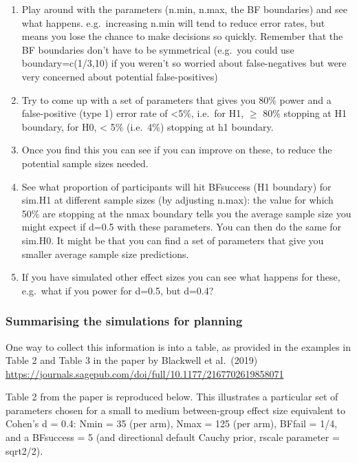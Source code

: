 \documentclass[
]{book}
\begin{document}
\begin{enumerate}
\def\labelenumi{\arabic{enumi}.}
\item
  Play around with the parameters (n.min, n.max, the BF boundaries) and see what happens. e.g.~increasing n.min will tend to reduce error rates, but means you lose the chance to make decisions so quickly. Remember that the BF boundaries don't have to be symmetrical (e.g.~you could use boundary=c(1/3,10) if you weren't so worried about false-negatives but were very concerned about potential false-positives)
\item
  Try to come up with a set of parameters that gives you 80\% power and a false-positive (type 1) error rate of \textless5\%, i.e.~for H1, \(\geq\) 80\% stopping at H1 boundary, for H0, \textless{} 5\% (i.e.~4\%) stopping at h1 boundary.
\item
  Once you find this you can see if you can improve on these, to reduce the potential sample sizes needed.
\item
  See what proportion of participants will hit BFsuccess (H1 boundary) for sim.H1 at different sample sizes (by adjusting n.max): the value for which 50\% are stopping at the nmax boundary tells you the average sample size you might expect if d=0.5 with these parameters. You can then do the same for sim.H0. It might be that you can find a set of parameters that give you smaller average sample size predictions.
\item
  If you have simulated other effect sizes you can see what happens for these, e.g.~what if you power for d=0.5, but d=0.4?
\end{enumerate}

\hypertarget{summarising-the-simulations-for-planning}{%
\subsubsection{Summarising the simulations for planning}\label{summarising-the-simulations-for-planning}}

One way to collect this information is into a table, as provided in the examples in Table 2 and Table 3 in the paper by Blackwell et al.~(2019) \url{https://journals.sagepub.com/doi/full/10.1177/2167702619858071}

Table 2 from the paper is reproduced below. This illustrates a particular set of parameters chosen for a small to medium between-group effect size equivalent to Cohen's d = 0.4: Nmin = 35 (per arm), Nmax = 125 (per arm), BFfail = 1/4, and a BFsuccess = 5 (and directional default Cauchy prior, rscale parameter = sqrt2/2).
\end{document}
